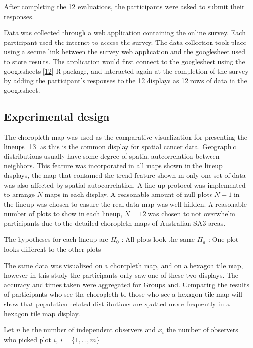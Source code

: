 \documentclass[conference,final,]{IEEEtran}
\begin{document}
After completing the 12 evaluations, the participants were asked to submit their responses.

Data was collected through a web application containing the online survey.
Each participant used the internet to access the survey.
The data collection took place using a secure link between the survey web application and the googlesheet used to store results. The application would first connect to the googlesheet using the googlesheets {[}\protect\hyperlink{ref-sheets}{12}{]} R package, and interacted again at the completion of the survey by adding the participant's responses to the 12 displays as 12 rows of data in the googlesheet.

\hypertarget{experimental-design}{%
\subsection{Experimental design}\label{experimental-design}}

The choropleth map was used as the comparative visualization for presenting the lineups {[}\protect\hyperlink{ref-VVSIALM}{13}{]} as this is the common display for spatial cancer data.
Geographic distributions usually have some degree of spatial autcorrelation between neighbors.
This feature was incorporated in all maps shown in the lineup displays, the map that contained the trend feature shown in only one set of data was also affected by spatial autocorrelation.
A line up protocol was implemented to arrange \(N\) maps in each display.
A reasonable amount of null plots \(N-1\) in the lineup was chosen to ensure the real data map was well hidden. A reasonable number of plots to show in each lineup, \(N = 12\) was chosen to not overwhelm participants due to the detailed choropleth maps of Australian SA3 areas.

The hypotheses for each lineup are
\(H_0\) : All plots look the same
\(H_a\) : One plot looks different to the other plots

The same data was visualized on a choropleth map, and on a hexagon tile map, however in this study the participants only saw one of these two displays. The accuracy and times taken were aggregated for Groups and.
Comparing the results of participants who see the choropleth to those who see a hexagon tile map will show that population related distributions are spotted more frequently in a hexagon tile map display.

Let \(n\) be the number of independent observers and \(x_i\) the
number of observers who picked plot \(i\), \(i = \{1,...,m\}\)
\end{document}

